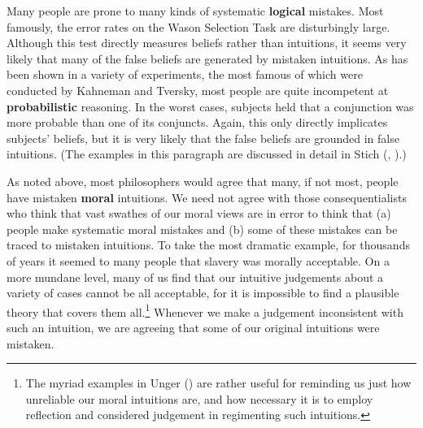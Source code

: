 \documentclass[
  11pt,
  letterpaper,
  DIV=11,
  numbers=noendperiod,
  twoside]{scrartcl}
\begin{document}
Many people are prone to many kinds of systematic \textbf{logical}
mistakes. Most famously, the error rates on the Wason Selection Task are
disturbingly large. Although this test directly measures beliefs rather
than intuitions, it seems very likely that many of the false beliefs are
generated by mistaken intuitions. As has been shown in a variety of
experiments, the most famous of which were conducted by Kahneman and
Tversky, most people are quite incompetent at \textbf{probabilistic}
reasoning. In the worst cases, subjects held that a conjunction was more
probable than one of its conjuncts. Again, this only directly implicates
subjects' beliefs, but it is very likely that the false beliefs are
grounded in false intuitions. (The examples in this paragraph are
discussed in detail in Stich (,
).)

As noted above, most philosophers would agree that many, if not most,
people have mistaken \textbf{moral} intuitions. We need not agree with
those consequentialists who think that vast swathes of our moral views
are in error to think that (a) people make systematic moral mistakes and
(b) some of these mistakes can be traced to mistaken intuitions. To take
the most dramatic example, for thousands of years it seemed to many
people that slavery was morally acceptable. On a more mundane level,
many of us find that our intuitive judgements about a variety of cases
cannot be all acceptable, for it is impossible to find a plausible
theory that covers them all.\footnote{The myriad examples in Unger
  () are rather useful for reminding us
  just how unreliable our moral intuitions are, and how necessary it is
  to employ reflection and considered judgement in regimenting such
  intuitions.} Whenever we make a judgement inconsistent with such an
intuition, we are agreeing that some of our original intuitions were
mistaken.
\end{document}
